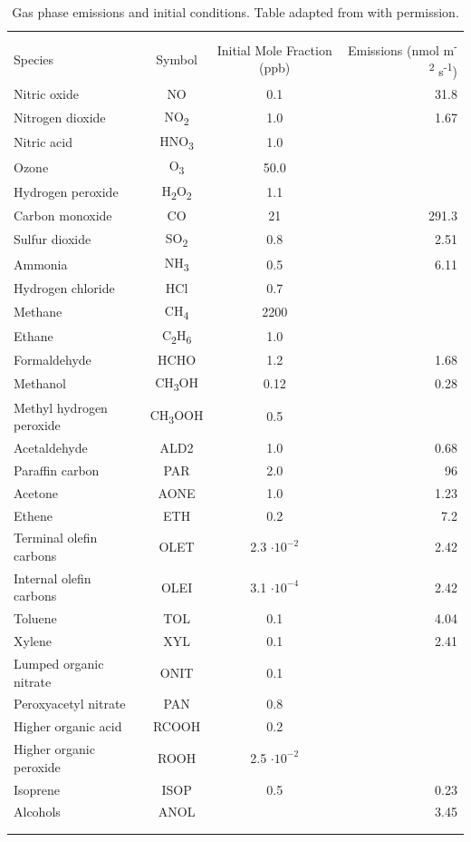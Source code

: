 \documentclass[journal abbreviation, manuscript]{copernicus}
\begin{document}
\begin{table}[!t]
\centering
\caption{Gas phase emissions and initial conditions. Table adapted from \citet{riemer_simulating_2009} with permission.}
\begin{tabular*}{\linewidth}{@{\extracolsep{\fill}} lccr}
\\[-2ex]\hline 
     \hline \\[-2ex] Species & Symbol & Initial Mole Fraction (ppb) & Emissions (nmol m\textsuperscript{-2} s\textsuperscript{-1}) \\
\midrule
Nitric oxide & NO & 0.1 & 31.8 \\
Nitrogen dioxide & NO\textsubscript{2} & 1.0 & 1.67 \\
Nitric acid & HNO\textsubscript{3} & 1.0 & \\
Ozone & O\textsubscript{3} & 50.0 & \\
Hydrogen peroxide & H\textsubscript{2}O\textsubscript{2} & 1.1 & \\
Carbon monoxide & CO & 21 & 291.3 \\
Sulfur dioxide & SO\textsubscript{2} & 0.8 & 2.51 \\
Ammonia & NH\textsubscript{3} & 0.5 & 6.11 \\
Hydrogen chloride & HCl & 0.7 & \\
Methane & CH\textsubscript{4} & 2200 & \\
Ethane & C\textsubscript{2}H\textsubscript{6} & 1.0 & \\
Formaldehyde & HCHO & 1.2 & 1.68 \\
Methanol & CH\textsubscript{3}OH & 0.12 & 0.28 \\
Methyl hydrogen peroxide & CH\textsubscript{3}OOH & 0.5 & \\
Acetaldehyde & ALD2 & 1.0 & 0.68 \\
Paraffin carbon & PAR & 2.0 & 96 \\
Acetone & AONE & 1.0 & 1.23 \\
Ethene & ETH & 0.2 & 7.2 \\
Terminal olefin carbons & OLET & 2.3 \(\cdot 10^{-2}\) & 2.42 \\
Internal olefin carbons & OLEI & 3.1 \(\cdot 10^{-4}\) & 2.42 \\
Toluene & TOL & 0.1 & 4.04 \\
Xylene & XYL & 0.1 & 2.41 \\
Lumped organic nitrate & ONIT & 0.1 & \\
Peroxyacetyl nitrate & PAN & 0.8 & \\
Higher organic acid & RCOOH & 0.2 & \\
Higher organic peroxide & ROOH & 2.5 \(\cdot 10^{-2}\) & \\
Isoprene & ISOP & 0.5 & 0.23 \\
Alcohols & ANOL & & 3.45 \\
\\[-2ex]\hline 
     \hline \\[-2ex]
\end{tabular*}
\label{table:gas_emiss_ics}
\end{table}
\end{document}
